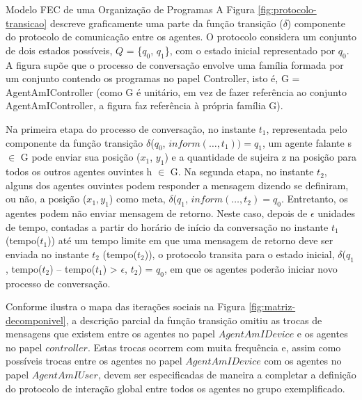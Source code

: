\begin{section}{Modelo FEC de uma Organização de Programas}
        \clearpage
        A Figura \ref{fig:protocolo-transicao} descreve graficamente uma parte da função transição ($\delta$) componente do protocolo de comunicação entre os agentes. O protocolo considera um conjunto de dois estados possíveis, $Q$ = \{$q_0$, $q_1$\}, com o estado inicial representado por $q_0$. A figura supõe que o processo de conversação envolve uma família formada por um conjunto contendo os programas no papel Controller, isto é, G = {AgentAmIController} (como G é unitário, em vez de fazer referência ao conjunto AgentAmIController, a figura faz referência à própria família G).
            
        \begin{figure}[h!]
            \centering
        \end{figure}
       
        Na primeira etapa do processo de conversação, no instante $t_1$, representada pelo componente da função transição $\delta$($q_0$, $inform(\ldots, t_1)) = q_1$, um agente falante s $\in$ G pode enviar sua posição ($x_1$, $y_1$) e a quantidade de sujeira z na posição para todos os outros agentes ouvintes h $\in$ G. Na segunda etapa, no instante $t_2$, alguns dos agentes ouvintes podem responder a mensagem dizendo se definiram, ou não, a posição ($x_1,y_1$) como meta, $\delta$($q_1$, $inform(\ldots, t_2) = q_0$. Entretanto, os agentes podem não enviar mensagem de retorno. Neste caso, depois de $\epsilon$ unidades de tempo, contadas a partir do horário de início da conversação no instante $t_1$ (tempo($t_1$)) até um tempo limite em que uma mensagem de retorno deve ser enviada no instante $t_2$ (tempo($t_2$)), o protocolo transita para o estado inicial, $\delta$($q_1$, tempo($t_2$) – tempo($t_1$) > $\epsilon$, $t_2$) = $q_0$, em que os agentes poderão iniciar novo processo de conversação.
        
        Conforme ilustra o mapa das iterações sociais na Figura \ref{fig:matriz-decomponivel}, a descrição parcial da função transição omitiu as trocas de mensagens que existem entre os agentes no papel $AgentAmIDevice$ e os agentes no papel $controller$. Estas trocas ocorrem com muita frequência e, assim como possíveis trocas entre os agentes no papel $AgentAmIDevice$ com os agentes no papel $AgentAmIUser$, devem ser especificadas de maneira a completar a definição do protocolo de interação global entre todos os agentes no grupo exemplificado.
        
\end{section}

